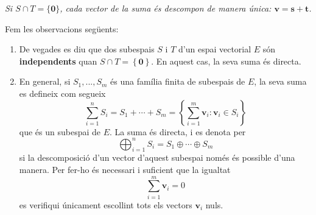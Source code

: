 \begin{center}
%

{\small\itshape Si $S\cap T=\{\mathbf{0}\}$, cada vector de la suma és descompon de manera única: $\mathbf{v}=\mathbf{s}+\mathbf{t}$.}
\end{center}

\begin{observacio}
Fem les observacions següents:

\begin{enumerate}
\item De vegades es diu que dos subespais $S$ i $T$ d’un
espai vectorial $E$ són \textbf{independents} quan $S%
\cap T=\left\{ \mathbf{0}\right\} $. En aquest cas, la seva suma és
directa.

\item En general, si $S_{1},...,S_{m}$ és una família
finita de subespais de $E$, la seva suma es defineix com segueix%
\begin{equation*}
\sum_{i=1}^{n}S_{i}=S_{1}+\cdots +S_{m}=\left\{
\sum_{i=1}^{m}\mathbf{v}_{i}:\mathbf{v}_{i}\in S_{i}\right\}
\end{equation*}%
que és un subespai de $E$. La suma és directa, i es denota
per 
\begin{equation*}
\bigoplus_{i=1}^{n}S_{i}=S_{1}\oplus \cdots \oplus S_{m}
\end{equation*}%
si la descomposició d’un vector d’aquest subespai només és possible
d’una manera. Per fer-ho és necessari i suficient que la igualtat%
\begin{equation*}
\sum_{i=1}^{m}\mathbf{v}_{i}=0
\end{equation*}%
es verifiqui únicament escollint tots els vectors $\mathbf{v}_{i}$
nuls.
\end{enumerate}
\end{observacio}


